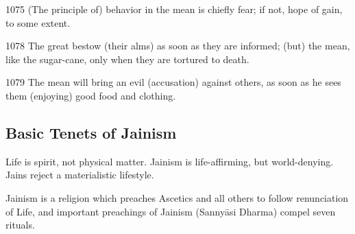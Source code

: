 1075 (The principle of) behavior in the mean is chiefly fear; if not, hope of gain, to some extent. 

1078 The great bestow (their alms) as soon as they are informed; (but) the mean, like the sugar-cane, only when they are tortured to death. 

1079 The mean will bring an evil (accusation) against others, as soon as he sees them (enjoying) good food and clothing.


\subsection*{Basic Tenets of Jainism}

Life is spirit, not physical matter. Jainism is life-affirming, but world-denying. Jains reject a materialistic lifestyle.

Jainism is a religion which preaches Ascetics and all others to follow renunciation of Life, and important preachings of Jainism (Sannyāsi Dharma) compel seven rituals.


